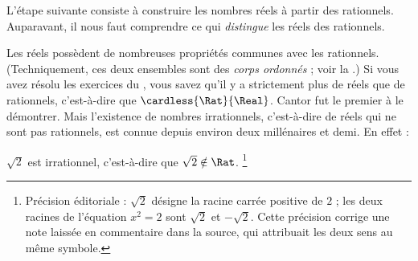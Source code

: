 \documentclass[11pt,a4paper,openany]{memoir}
\begin{document}

L'étape suivante consiste à construire les nombres réels à partir des
rationnels. Auparavant, il nous faut comprendre ce qui \emph{distingue}
les réels des rationnels.

Les réels possèdent de nombreuses propriétés communes avec les rationnels.
(Techniquement, ces deux ensembles sont des \emph{corps ordonnés} ; voir
la .) Si vous avez résolu les
exercices du , vous savez qu'il y a strictement plus
de réels que de rationnels, c'est-à-dire que $\cardless{\Rat}{\Real}$.
Cantor fut le premier à le démontrer. Mais l'existence de nombres
irrationnels, c'est-à-dire de réels qui ne sont pas rationnels, est connue
depuis environ deux millénaires et demi. En effet :
\begin{thm}
$\sqrt{2}$ est irrationnel, c'est-à-dire que $\sqrt{2} \notin \Rat$.
\footnote{Précision éditoriale : $\sqrt{2}$ désigne la racine carrée positive de $2$ ; les deux racines de l'équation $x^2=2$ sont $\sqrt{2}$ et $-\sqrt{2}$. Cette précision corrige une note laissée en commentaire dans la source, qui attribuait les deux sens au même symbole.}\end{thm}
\end{document}
